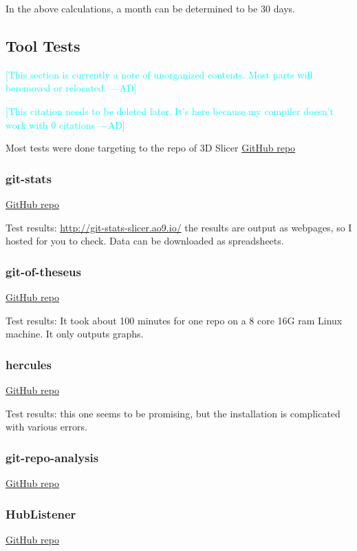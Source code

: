 \documentclass[letterpaper,cleveref]{lipics-v2019}
\newcommand{\authornote}[3]{\textcolor{#1}{[#3 ---#2]}}
\newcommand{\authornote}[3]{}
\newcommand{\ad}[1]{\authornote{cyan}{AD}{#1}} %
\theoremstyle{definition}
\begin{document}
In the above calculations, a month can be determined to be 30 days.

\subsection{Tool Tests}
\ad{This section is currently a note of unorganized contents. Most parts will beremoved or relocated.}

\ad{This citation needs to be deleted later. It's here because my compiler
doesn't work with 0 citations}
\cite{Emms2019}

Most tests were done targeting to the repo of 3D Slicer
\href{https://github.com/tomgi/git_stats}{GitHub repo}

\subsubsection{git-stats}
\href{https://github.com/tomgi/git_stats}{GitHub repo}

Test results:
\href{http://git-stats-slicer.ao9.io/}{http://git-stats-slicer.ao9.io/} the
results are output as webpages, so I hosted for you to check. Data can be
downloaded as spreadsheets.

\subsubsection{git-of-theseus}
\href{https://github.com/erikbern/git-of-theseus}{GitHub repo}

Test results: It took about 100 minutes for one repo on a 8 core 16G ram Linux
machine. It only outputs graphs.

\subsubsection{hercules}
\href{https://github.com/src-d/hercules}{GitHub repo}

Test results: this one seems to be promising, but the installation is
complicated with various errors.

\subsubsection{git-repo-analysis}
\href{https://github.com/larsxschneider/git-repo-analysis}{GitHub repo}

\subsubsection{HubListener}
\href{https://github.com/pjmc-oliveira/HubListener}{GitHub repo}
\end{document}
